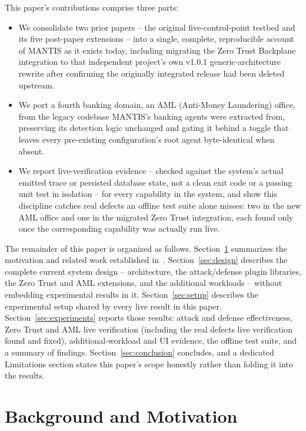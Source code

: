 \documentclass[conference]{IEEEtran}
\begin{document}
This paper's contributions comprise three parts:
\begin{itemize}
\item We consolidate two prior papers -- the original five-control-point testbed and its five post-paper extensions -- into a single, complete, reproducible account of MANTIS as it exists today, including migrating the Zero Trust Backplane integration to that independent project's own v1.0.1 generic-architecture rewrite after confirming the originally integrated release had been deleted upstream.
\item We port a fourth banking domain, an AML (Anti-Money Laundering) office, from the legacy codebase MANTIS's banking agents were extracted from, preserving its detection logic unchanged and gating it behind a toggle that leaves every pre-existing configuration's root agent byte-identical when absent.
\item We report live-verification evidence -- checked against the system's actual emitted trace or persisted database state, not a clean exit code or a passing unit test in isolation -- for every capability in the system, and show this discipline catches real defects an offline test suite alone misses: two in the new AML office and one in the migrated Zero Trust integration, each found only once the corresponding capability was actually run live.
\end{itemize}

The remainder of this paper is organized as follows. Section~\ref{sec:background} summarizes the motivation and related work established in~\cite{mantis_paper1}. Section~\ref{sec:design} describes the complete current system design -- architecture, the attack/defense plugin libraries, the Zero Trust and AML extensions, and the additional workloads -- without embedding experimental results in it. Section~\ref{sec:setup} describes the experimental setup shared by every live result in this paper. Section~\ref{sec:experiments} reports those results: attack and defense effectiveness, Zero Trust and AML live verification (including the real defects live verification found and fixed), additional-workload and UI evidence, the offline test suite, and a summary of findings. Section~\ref{sec:conclusion} concludes, and a dedicated Limitations section states this paper's scope honestly rather than folding it into the results.

\section{Background and Motivation}
\label{sec:background}
\end{document}
